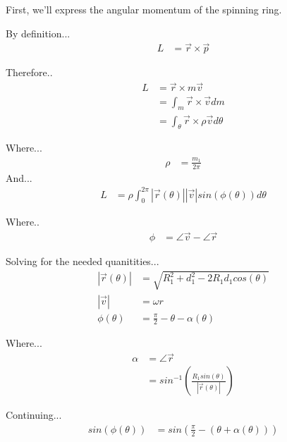 \documentclass{article}
\begin{document}
	First, we'll express the angular momentum of the spinning ring.

	By definition...
	\begin{align}
		L &= \vec{r} \times\vec{p}
	\end{align}

	Therefore..
	\begin{align}
		L &= \vec{r} \times m \vec{v} \\
		 &= \int_m\vec{r}\times\vec{v} dm \\
		 &= \int_{\theta}\vec{r}\times\rho\vec{v} d\theta
	\end{align}

	Where...
	\begin{align}
		\rho &= \frac{m_1}{2\pi}
	\end{align}
	And...
	\begin{align}
		L &= \rho\int_0^{2\pi}|\vec{r}(\theta)||\vec{v}|sin(\phi(\theta))d\theta
	\end{align}

	Where..
	\begin{align}
		\phi &= \angle\vec{v} - \angle\vec{r}
	\end{align}

	Solving for the needed quanitities...
	\begin{align}
		|\vec{r}(\theta)| &= \sqrt{R_1^2 + d_1^2 -2R_1d_1cos(\theta)} \\
		|\vec{v}| &= \omega r\\
		\phi(\theta) &= \frac{\pi}{2}-\theta-\alpha(\theta)
	\end{align}

	Where...
	\begin{align}
		\alpha &= \angle\vec{r}\\
		 &= sin^{-1}(\frac{R_1sin(\theta)}{|\vec{r}(\theta)|})
	\end{align}

	Continuing...
	\begin{align}
		sin(\phi(\theta)) &= sin(\frac{\pi}{2}-(\theta+\alpha(\theta)))
	\end{align}
\end{document}
